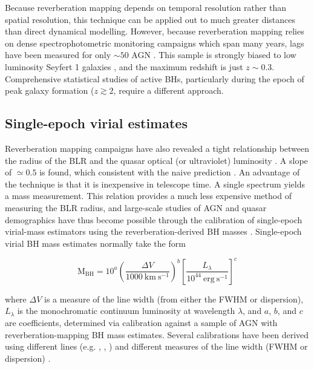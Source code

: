 Because reverberation mapping depends on temporal resolution rather than spatial resolution, this technique can be applied out to much greater distances than direct dynamical modelling.
However, because reverberation mapping relies on dense spectrophotometric monitoring campaigns which span many years, lags have been measured for only $\sim50$ AGN \citep[e.g.][]{kaspi00,peterson04,kaspi07,bentz09,denney10,barth11,grier12}. 
This sample is strongly biased to low luminosity Seyfert 1 galaxies , and the maximum redshift is just $z\sim0.3$. 
Comprehensive statistical studies of active BHs, particularly during the epoch of peak galaxy formation ($z\gtrsim2$, require a different approach. 

\subsection{Single-epoch virial estimates}

Reverberation mapping campaigns have also revealed a tight relationship between the radius of the BLR and the quasar optical (or ultraviolet) luminosity \citep[the $R-L$ relation; e.g.][]{kaspi00,kaspi07}.
A slope of $\simeq0.5$ is found, which consistent with the naive prediction \citep[e.g.][]{peterson97}. 
An advantage of the technique is that it is inexpensive in telescope time. 
A single spectrum yields a mass measurement. 
This relation provides a much less expensive method of measuring the BLR radius, and large-scale studies of AGN and quasar demographics have thus become possible through the calibration of single-epoch virial-mass estimators using the reverberation-derived BH masses \citep[e.g.][]{greene05b,vestergaard06,vestergaard09,shen11,shen12,trakhtenbrot12}.
Single-epoch virial BH mass estimates normally take the form

\begin{equation}
  \label{eq:virialmass}
  \mathrm{M_{BH}} = 10^{a} \left( \frac{\Delta V}{1000~\mathrm{km~s^{-1}}} \right)^b \left[ \frac{L_{\lambda}}{10^{44}~\mathrm{erg~s^{-1}}} \right]^c
\end{equation}

\noindent where $\Delta V$ is a measure of the line width (from either the FWHM or dispersion), $L_\lambda$ is the monochromatic continuum luminosity at wavelength $\lambda$, and $a$, $b$, and $c$ are coefficients, determined via calibration against a sample of AGN with reverberation-mapping BH mass estimates. Several calibrations have been derived using different lines (e.g. \hbns, , ) and different measures of the line width (FWHM or dispersion) \citep[e.g.][]{vestergaard02,mclure02,vestergaard06,mcgill08,wang09,rafiee11,park13}.

